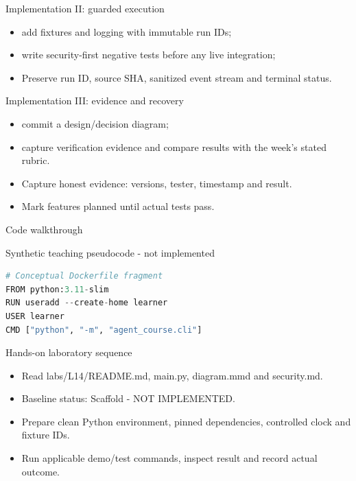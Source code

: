 \documentclass[aspectratio=169,10pt]{beamer}
\begin{document}
\begin{frame}{Implementation II: guarded execution}
\small
\begin{itemize}
\item add fixtures and logging with immutable run IDs;
\item write security-first negative tests before any live integration;
\item Preserve run ID, source SHA, sanitized event stream and terminal status.
\end{itemize}

\end{frame}

\begin{frame}{Implementation III: evidence and recovery}
\small
\begin{itemize}
\item commit a design/decision diagram;
\item capture verification evidence and compare results with the week's stated rubric.
\item Capture honest evidence: versions, tester, timestamp and result.
\item Mark features planned until actual tests pass.
\end{itemize}

\end{frame}

\begin{frame}[fragile]{Code walkthrough}
\small
\begin{block}{Synthetic teaching pseudocode - not implemented}\end{block}
\begin{lstlisting}[language=Python]
# Conceptual Dockerfile fragment
FROM python:3.11-slim
RUN useradd --create-home learner
USER learner
CMD ["python", "-m", "agent_course.cli"]
\end{lstlisting}

\end{frame}

\begin{frame}{Hands-on laboratory sequence}
\small
\begin{itemize}
\item Read labs/L14/README.md, main.py, diagram.mmd and security.md.
\item Baseline status: Scaffold - NOT IMPLEMENTED.
\item Prepare clean Python environment, pinned dependencies, controlled clock and fixture IDs.
\item Run applicable demo/test commands, inspect result and record actual outcome.
\end{itemize}

\end{frame}
\end{document}
